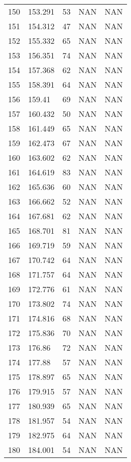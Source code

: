 \documentclass{article}
\begin{document}
\begin{longtable}{@{}lllll@{}}
				150 & 153.291 & 53    & NAN   & NAN   \\
				151 & 154.312 & 47    & NAN   & NAN   \\
				152 & 155.332 & 65    & NAN   & NAN   \\
				153 & 156.351 & 74    & NAN   & NAN   \\
				154 & 157.368 & 62    & NAN   & NAN   \\
				155 & 158.391 & 64    & NAN   & NAN   \\
				156 & 159.41  & 69    & NAN   & NAN   \\
				157 & 160.432 & 50    & NAN   & NAN   \\
				158 & 161.449 & 65    & NAN   & NAN   \\
				159 & 162.473 & 67    & NAN   & NAN   \\
				160 & 163.602 & 62    & NAN   & NAN   \\
				161 & 164.619 & 83    & NAN   & NAN   \\
				162 & 165.636 & 60    & NAN   & NAN   \\
				163 & 166.662 & 52    & NAN   & NAN   \\
				164 & 167.681 & 62    & NAN   & NAN   \\
				165 & 168.701 & 81    & NAN   & NAN   \\
				166 & 169.719 & 59    & NAN   & NAN   \\
				167 & 170.742 & 64    & NAN   & NAN   \\
				168 & 171.757 & 64    & NAN   & NAN   \\
				169 & 172.776 & 61    & NAN   & NAN   \\
				170 & 173.802 & 74    & NAN   & NAN   \\
				171 & 174.816 & 68    & NAN   & NAN   \\
				172 & 175.836 & 70    & NAN   & NAN   \\
				173 & 176.86  & 72    & NAN   & NAN   \\
				174 & 177.88  & 57    & NAN   & NAN   \\
				175 & 178.897 & 65    & NAN   & NAN   \\
				176 & 179.915 & 57    & NAN   & NAN   \\
				177 & 180.939 & 65    & NAN   & NAN   \\
				178 & 181.957 & 54    & NAN   & NAN   \\
				179 & 182.975 & 64    & NAN   & NAN   \\
				180 & 184.001 & 54    & NAN   & NAN   \\

\end{longtable}
\end{document}
